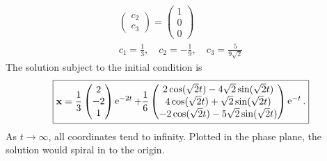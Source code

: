 \begin{Solution}
\begin{gather*}
\begin{pmatrix}
      c_2 \\
      c_3
    \end{pmatrix}
    =
    \begin{pmatrix}
      1 \\
      0 \\
      0
    \end{pmatrix} \\
    c_1 = \frac{1}{3}, \quad c_2 = - \frac{1}{9}, \quad c_3 = \frac{5}{9 \sqrt{2}}
  \end{gather*}
  The solution subject to the initial condition is
  \[
  \boxed{
    \mathbf{x} = 
    \frac{1}{3} \begin{pmatrix} 2 \\ -2 \\ 1 \end{pmatrix} \mathop{\mathrm{e}}\nolimits^{-2 t}
    + \frac{1}{6} \begin{pmatrix} 
      2 \cos(\sqrt{2} t) - 4 \sqrt{2} \sin(\sqrt{2} t) \\
      4 \cos(\sqrt{2} t) + \sqrt{2} \sin(\sqrt{2} t) \\
      -2 \cos(\sqrt{2} t) - 5 \sqrt{2} \sin(\sqrt{2} t) \\
    \end{pmatrix} \mathop{\mathrm{e}}\nolimits^{-t}.
    }
  \]
  As $t \to \infty$, all coordinates tend to infinity.  Plotted in the phase plane, 
  the solution would spiral in to the origin.
\end{Solution}





